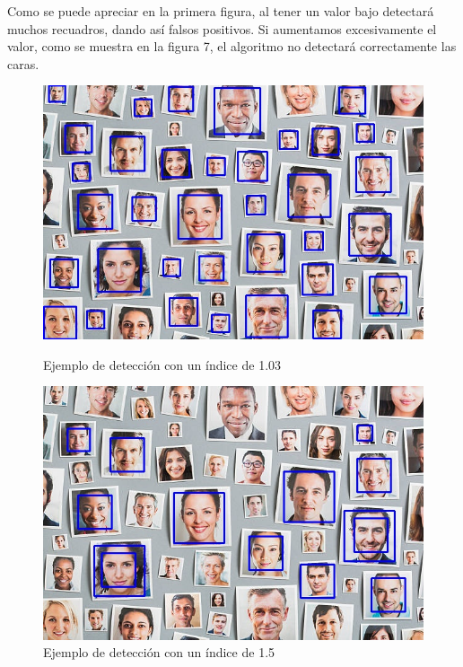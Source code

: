 \documentclass[a4paper]{article}
\begin{document}
Como se puede apreciar en la primera figura, al tener un valor bajo detectará muchos recuadros, dando así falsos positivos. Si aumentamos excesivamente el valor, como se muestra en la figura 7, el algoritmo no detectará correctamente las caras.

\begin{figure}[h!]
    \centering
    \begin{minipage}[b]{0.48\textwidth}
        \includegraphics[width=\textwidth]{../img/multImages_face_detection103.jpg}
        \caption{Ejemplo de detección con un índice de 1.03}
    \end{minipage}
    \hfill
    \begin{minipage}[b]{0.48\textwidth}
        \includegraphics[width=\textwidth]{../img/multImages_face_detection15.jpg}
        \caption{Ejemplo de detección con un índice de 1.5}
    \end{minipage}
\end{figure}
\end{document}
